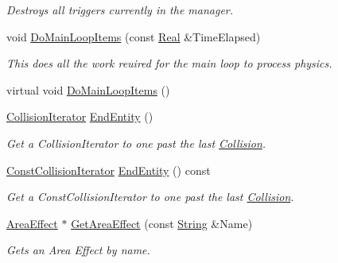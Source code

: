 \begin{DoxyCompactItemize}
\begin{DoxyCompactList}\small\item\em Destroys all triggers currently in the manager. \item\end{DoxyCompactList}\item 
void \hyperlink{classMezzanine_1_1PhysicsManager_a9fffb77acb0644d31ea78de4e823c0a0}{DoMainLoopItems} (const \hyperlink{namespaceMezzanine_a726731b1a7df72bf3583e4a97282c6f6}{Real} \&TimeElapsed)
\begin{DoxyCompactList}\small\item\em This does all the work reuired for the main loop to process physics. \item\end{DoxyCompactList}\item 
virtual void \hyperlink{classMezzanine_1_1PhysicsManager_a21df393f2356a20151fce997577e3d76}{DoMainLoopItems} ()
\item 
\hyperlink{classMezzanine_1_1PhysicsManager_a8d2fa60cdfdc7997a09cb8a3434371af}{CollisionIterator} \hyperlink{classMezzanine_1_1PhysicsManager_a5c5f6e44ee8cb787bddf4b813a642bea}{EndEntity} ()
\begin{DoxyCompactList}\small\item\em Get a CollisionIterator to one past the last \hyperlink{classMezzanine_1_1Collision}{Collision}. \item\end{DoxyCompactList}\item 
\hyperlink{classMezzanine_1_1PhysicsManager_a667151fe9525d7f3f174ad55a499065f}{ConstCollisionIterator} \hyperlink{classMezzanine_1_1PhysicsManager_aadf3425aa56497b63229a092cf0f798c}{EndEntity} () const 
\begin{DoxyCompactList}\small\item\em Get a ConstCollisionIterator to one past the last \hyperlink{classMezzanine_1_1Collision}{Collision}. \item\end{DoxyCompactList}\item 
\hyperlink{classMezzanine_1_1AreaEffect}{AreaEffect} $\ast$ \hyperlink{classMezzanine_1_1PhysicsManager_a820856e1a0bad25203b86d6e53391f13}{GetAreaEffect} (const \hyperlink{namespaceMezzanine_acf9fcc130e6ebf08e3d8491aebcf1c86}{String} \&Name)
\begin{DoxyCompactList}\small\item\em Gets an Area Effect by name. \item\end{DoxyCompactList}\item 

\end{DoxyCompactItemize}
